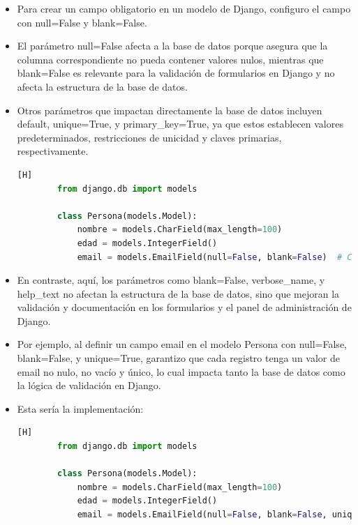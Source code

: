 \documentclass{article}
\begin{document}
        \begin{itemize}	
            \item Para crear un campo obligatorio en un modelo de Django, configuro el campo con null=False y blank=False. 
            \item El parámetro null=False afecta a la base de datos porque asegura que la columna correspondiente no pueda contener valores nulos, mientras que blank=False es relevante para la validación de formularios en Django y no afecta la estructura de la base de datos. 
            \item Otros parámetros que impactan directamente la base de datos incluyen default, unique=True, y primary\_key=True, ya que estos establecen valores predeterminados, restricciones de unicidad y claves primarias, respectivamente.

        \begin{lstlisting}[language=Python,caption={Implementación de la lógica con null y blank}][H]
        from django.db import models
        
        class Persona(models.Model):
            nombre = models.CharField(max_length=100)
            edad = models.IntegerField()
            email = models.EmailField(null=False, blank=False)  # Campo obligatorio
        \end{lstlisting}
        
            \item En contraste, aquí, los parámetros como blank=False, verbose\_name, y help\_text no afectan la estructura de la base de datos, sino que mejoran la validación y documentación en los formularios y el panel de administración de Django. 
            \item Por ejemplo, al definir un campo email en el modelo Persona con null=False, blank=False, y unique=True, garantizo que cada registro tenga un valor de email no nulo, no vacío y único, lo cual impacta tanto la base de datos como la lógica de validación en Django.
            \item Esta sería la implementación:

        \begin{lstlisting}[language=Python,caption={Implementación de la lógica de validación con unique}][H]
        from django.db import models

        class Persona(models.Model):
            nombre = models.CharField(max_length=100)
            edad = models.IntegerField()
            email = models.EmailField(null=False, blank=False, unique=True, help_text="Por favor, ingrese un email valido")  # Campo obligatorio y unico
        \end{lstlisting}
        \end{itemize}
\end{document}
